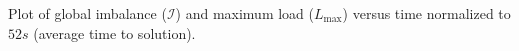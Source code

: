 Plot of global imbalance ($\mathcal{I}$) and maximum load ($L_{\max}$) versus time normalized to $52s$ (average time to solution).
